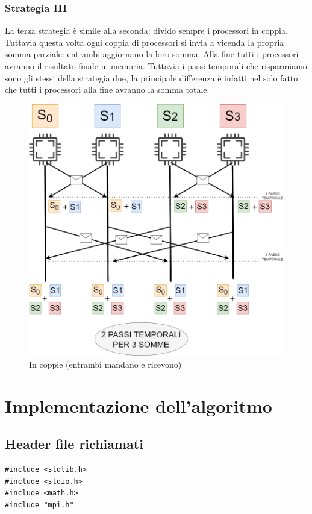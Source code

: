 \documentclass{article}
\begin{document}
\subsubsection{Strategia III}
    La terza strategia è simile alla seconda: divido sempre i processori in coppia.
    Tuttavia questa volta ogni coppia di processori si invia a vicenda la propria somma parziale: entrambi aggiornano la loro somma. Alla fine tutti i processori avranno il risultato finale in memoria. Tuttavia i passi temporali che risparmiamo sono gli stessi della strategia due, la principale differenza è infatti nel solo fatto che tutti i processori alla fine avranno la somma totale.
    \begin{figure}[!h tbp]
        \centering
        \includegraphics[width=1\linewidth]{strategia_III.drawio.png}
        \caption{In coppie (entrambi mandano e ricevono)}
        \label{fig:enter-label}
    \end{figure}
\clearpage
\section{Implementazione dell'algoritmo}
\subsection{Header file richiamati}
\begin{lstlisting}
#include <stdlib.h>
#include <stdio.h>
#include <math.h>
#include "mpi.h"
\end{lstlisting}
\end{document}
